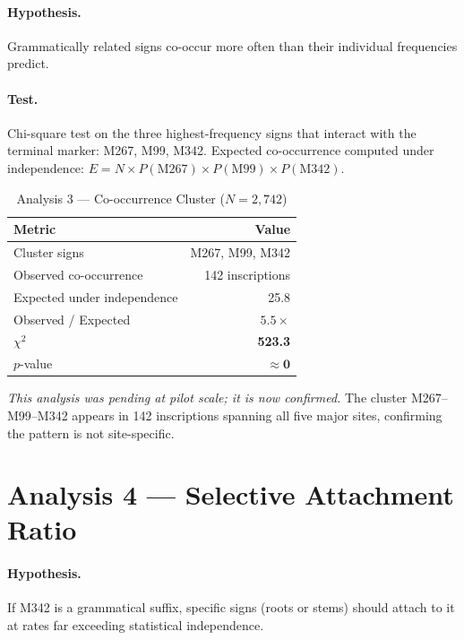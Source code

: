 \documentclass[12pt,letterpaper]{article}
\begin{document}
\paragraph{Hypothesis.}
Grammatically related signs co-occur more often than their individual
frequencies predict.

\paragraph{Test.}
Chi-square test on the three highest-frequency signs that interact with
the terminal marker: M267, M99, M342.
Expected co-occurrence computed under independence:
$E = N \times P(\text{M267}) \times P(\text{M99}) \times P(\text{M342})$.

\begin{table}[h!]
\centering
\caption{Analysis 3 --- Co-occurrence Cluster ($N = 2{,}742$)}
\begin{tabular}{lr}
\toprule
Metric & Value \\
\midrule
Cluster signs       & M267, M99, M342 \\
Observed co-occurrence & 142 inscriptions \\
Expected under independence & 25.8 \\
Observed / Expected  & $5.5\times$ \\
$\chi^2$             & \textbf{523.3} \\
$p$-value            & $\mathbf{\approx 0}$ \\
\bottomrule
\end{tabular}
\end{table}

\emph{This analysis was pending at pilot scale; it is now confirmed.}
The cluster M267--M99--M342 appears in 142 inscriptions spanning
all five major sites, confirming the pattern is not site-specific.

\section{Analysis 4 --- Selective Attachment Ratio}
\label{sec:analysis4}

\paragraph{Hypothesis.}
If M342 is a grammatical suffix, specific signs (roots or stems) should
attach to it at rates far exceeding statistical independence.
\end{document}
